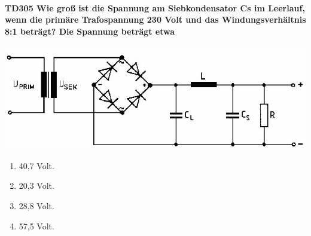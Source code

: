 \documentclass[8pt]{article}
\begin{document}
\begin{enumerate}
\begin{enumerate}[nolistsep,label=\Alph*]
{\paragraph*{TD305 Wie groß ist die Spannung am Siebkondensator Cs im Leerlauf, wenn die primäre Trafospannung 230 Volt und das Windungsverhältnis 8:1 beträgt? Die Spannung beträgt etwa}
\begin{center}
	\begin{minipage}{\linewidth}
		\centering
		\includegraphics[scale=1.0]{pics/td305_a.jpg}
	\end{minipage}
\end{center}
\begin{enumerate}[nolistsep,label=\Alph*]
\item 40,7 Volt.
\item 20,3 Volt.
\item 28,8 Volt.
\item 57,5 Volt.
\end{enumerate}

}
\end{enumerate}
\end{enumerate}
\end{document}
